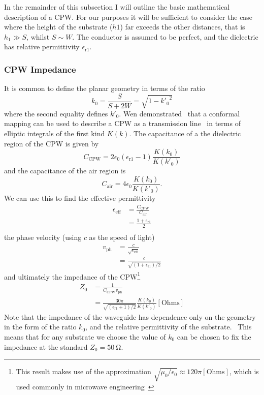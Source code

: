 In the remainder of this subsection I will outline the basic mathematical
description of a CPW. For our purposes it will be sufficient to consider the
case where the height of the substrate ($h1$) far exceeds the other distances,
that is $h_1 \gg S$, whilst $S \sim W$. The conductor is assumed to be perfect,
and the dielectric has relative permittivity $\epsilon_\mathrm{r1}$.

\subsubsection{CPW Impedance}

It is common to define the planar geometry in terms of the
ratio~\cite{1127105, Simons2004}
\begin{equation}
  k_0 = \frac{S}{S+2W} = \sqrt{1-{k'_0}^2}
  \label{eqn:k0def}
\end{equation}
where the second equality defines $k'_0$.
%
Wen demonstrated~\cite{1127105} that a conformal mapping can be used to describe
a CPW as a transmission line~\cite{Jackson1975} in terms of elliptic integrals
of the first kind $K(k)$. The capacitance of a the dielectric region of the CPW
is given by
\begin{equation}
  C_\mathrm{CPW} = 2\epsilon_0(\epsilon_\mathrm{r1}-1)\frac{K(k_0)}{K(k'_0)}
\end{equation}
and the capacitance of the air region is
\begin{equation}
  C_\mathrm{air} = 4\epsilon_0 \frac{K(k_0)}{K(k'_0)}.
\end{equation}
We can use this to find the effective permittivity 
\begin{align}
  \epsilon_\mathrm{eff} &= \frac{C_\mathrm{CPW}}{C_\mathrm{air}} \\
    &= \frac{1+ \epsilon_\mathrm{r1}}{2} \\
\end{align}
the phase velocity (using $c$ as the speed of light)
\begin{align}
  v_\mathrm{ph} &= \frac{c}{\sqrt{\epsilon_\mathrm{eff}}} \\
    &= \frac{c}{\sqrt{(1 + \epsilon_\mathrm{r1})/2}}
\end{align}
and ultimately the impedance of the CPW\footnote{This result makes use of the
approximation $\sqrt{\mu_0/\epsilon_0}\approx120\pi\mathrm{[Ohms]}$, which is
used commonly in microwave engineering~}
\begin{align}
  Z_0 &= \frac{1}{C_\mathrm{CPW} v_\mathrm{ph}} \\
    &= \frac{30 \pi}{\sqrt{(\epsilon_\mathrm{r1}+1)/2}} \frac{K(k_0)}{K(k'_0)}
    \mathrm{[Ohms]}
\end{align}
Note that the impedance of the waveguide has dependence only on the geometry in
the form of the ratio $k_0$, and the relative permittivity of the
substrate.~\cite{Simons2004} This means that for any substrate we choose the
value of $k_0$ can be chosen to fix the impedance at the standard $Z_0 =
\SI{50}{\ohm}$.


